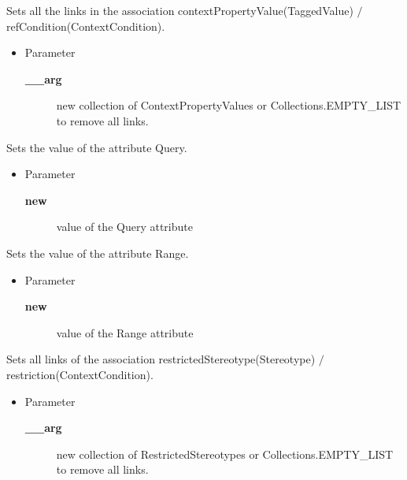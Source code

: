 \begin{desc}Sets all the links in the association contextPropertyValue(TaggedValue)
 $/$ refCondition(ContextCondition).
\begin{itemize}
\item{Parameter
  \begin{description}
   \item[{\bf \_\_arg}]{new collection of ContextPropertyValues or Collections.EMPTY\_LIST to
        remove all links.}
  \end{description}}
\end{itemize}
\end{desc}

\begin{desc}Sets the value of the attribute Query.
\begin{itemize}
\item{Parameter
  \begin{description}
   \item[{\bf new}]{value of the Query attribute}
  \end{description}}
\end{itemize}
\end{desc}

\begin{desc}Sets the value of the attribute Range.
\begin{itemize}
\item{Parameter
  \begin{description}
   \item[{\bf new}]{value of the Range attribute}
  \end{description}}
\end{itemize}
\end{desc}

\begin{desc}Sets all links of the association restrictedStereotype(Stereotype)
 $/$ restriction(ContextCondition).
\begin{itemize}
\item{Parameter
  \begin{description}
   \item[{\bf \_\_arg}]{new collection of RestrictedStereotypes or Collections.EMPTY\_LIST to
        remove all links.}
  \end{description}}
\end{itemize}
\end{desc}

